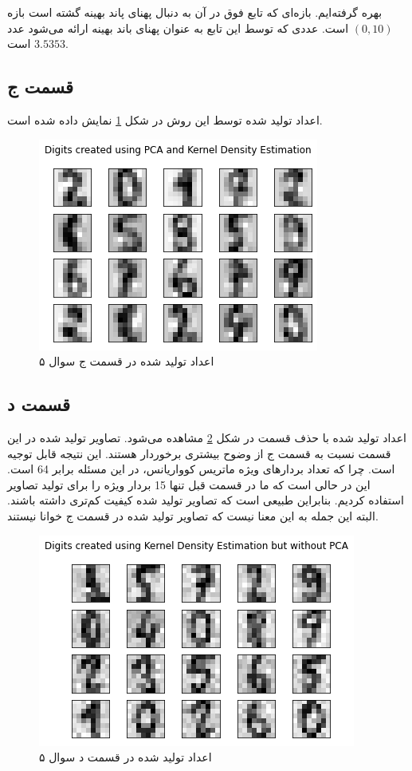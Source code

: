 \documentclass{article}
\begin{document}
بهره گرفته‌ایم. بازه‌ای که تابع فوق در آن به دنبال پهنای پاند بهینه گشته است بازه $(0,10)$ است.
عددی که توسط این تابع به عنوان پهنای باند بهینه ارائه می‌شود عدد $3.5353$ است.

\subsection*{قسمت ج}

اعداد تولید شده توسط این روش در شکل \ref{eigen_generated} نمایش داده شده است.

\begin{figure}[h]
    \centering
    \includegraphics[scale=0.4]{images/q5/eigen_generated.png}
    \caption{اعداد تولید شده در قسمت ج سوال ۵}
    \label{eigen_generated}
\end{figure}

\subsection*{قسمت د}

اعداد تولید شده با حذف قسمت  در شکل \ref{all_generated} مشاهده می‌شود.
تصاویر تولید شده در این قسمت نسبت به قسمت ج از وضوح بیشتری برخوردار هستند.
این نتیجه قابل توجیه است. چرا که تعداد بردار‌های ویژه ماتریس کوواریانس، در این مسئله
برابر 64 است. این در حالی است که ما در قسمت قبل تنها 15 بردار ویژه را برای تولید
تصاویر استفاده کردیم. بنابراین طبیعی است که تصاویر تولید شده کیفیت کم‌تری داشته باشند.
البته این جمله به این معنا نیست که تصاویر تولید شده در قسمت ج خوانا نیستند.

\begin{figure}[h]
    \centering
    \includegraphics[scale=0.4]{images/q5/all_generated.png}
    \caption{اعداد تولید شده در قسمت د سوال ۵}
    \label{all_generated}
\end{figure}
\end{document}
